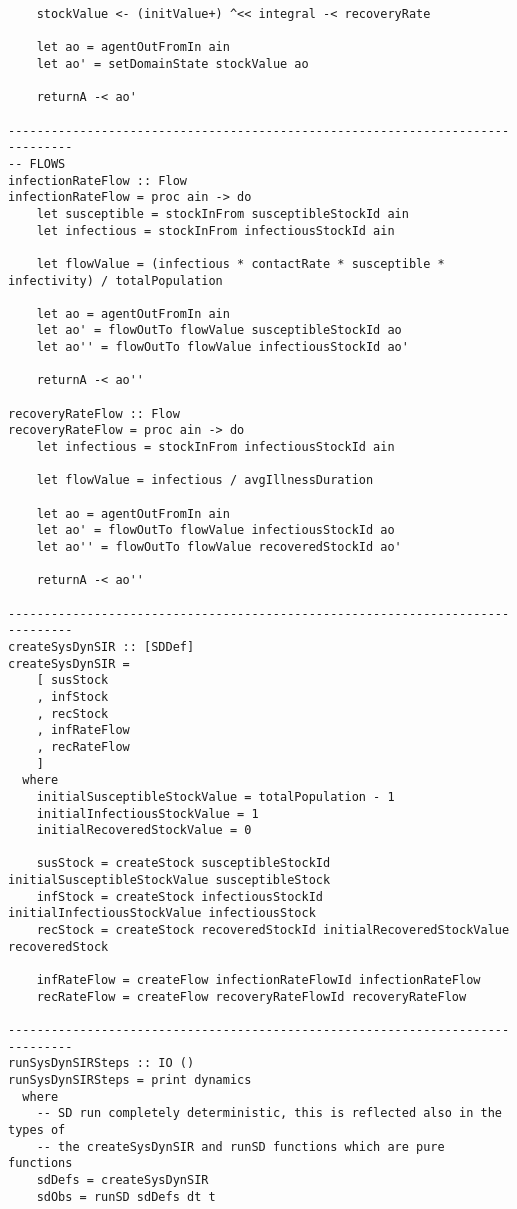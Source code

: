 \begin{verbatim}
    stockValue <- (initValue+) ^<< integral -< recoveryRate
    
    let ao = agentOutFromIn ain
    let ao' = setDomainState stockValue ao

    returnA -< ao'

-------------------------------------------------------------------------------
-- FLOWS
infectionRateFlow :: Flow
infectionRateFlow = proc ain -> do
    let susceptible = stockInFrom susceptibleStockId ain 
    let infectious = stockInFrom infectiousStockId ain

    let flowValue = (infectious * contactRate * susceptible * infectivity) / totalPopulation
    
    let ao = agentOutFromIn ain
    let ao' = flowOutTo flowValue susceptibleStockId ao
    let ao'' = flowOutTo flowValue infectiousStockId ao'

    returnA -< ao''

recoveryRateFlow :: Flow
recoveryRateFlow = proc ain -> do
    let infectious = stockInFrom infectiousStockId ain

    let flowValue = infectious / avgIllnessDuration
    
    let ao = agentOutFromIn ain
    let ao' = flowOutTo flowValue infectiousStockId ao
    let ao'' = flowOutTo flowValue recoveredStockId ao'

    returnA -< ao''

-------------------------------------------------------------------------------
createSysDynSIR :: [SDDef]
createSysDynSIR = 
    [ susStock
    , infStock
    , recStock
    , infRateFlow
    , recRateFlow
    ]
  where
    initialSusceptibleStockValue = totalPopulation - 1
    initialInfectiousStockValue = 1
    initialRecoveredStockValue = 0

    susStock = createStock susceptibleStockId initialSusceptibleStockValue susceptibleStock
    infStock = createStock infectiousStockId initialInfectiousStockValue infectiousStock
    recStock = createStock recoveredStockId initialRecoveredStockValue recoveredStock

    infRateFlow = createFlow infectionRateFlowId infectionRateFlow
    recRateFlow = createFlow recoveryRateFlowId recoveryRateFlow

-------------------------------------------------------------------------------
runSysDynSIRSteps :: IO ()
runSysDynSIRSteps = print dynamics
  where
    -- SD run completely deterministic, this is reflected also in the types of 
    -- the createSysDynSIR and runSD functions which are pure functions  
    sdDefs = createSysDynSIR
    sdObs = runSD sdDefs dt t 
            

\end{verbatim}
